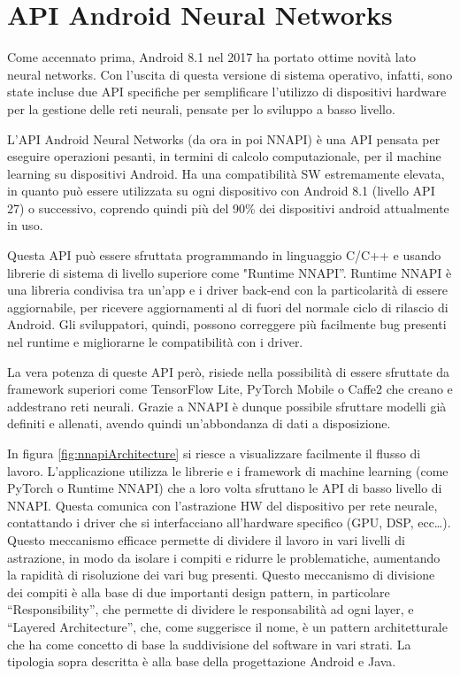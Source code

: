 
\section{API Android Neural Networks}
Come accennato prima, Android 8.1 nel 2017 ha portato ottime novità lato neural networks. Con l’uscita di questa versione di sistema operativo, infatti,
sono state incluse due API specifiche per semplificare l’utilizzo di dispositivi hardware per la gestione delle reti neurali, pensate per lo sviluppo a
basso livello.

L’API Android Neural Networks (da ora in poi NNAPI) è una API pensata per eseguire operazioni pesanti, in termini di calcolo computazionale, per il machine learning su
dispositivi Android. Ha una compatibilità SW estremamente elevata, in quanto può essere utilizzata su ogni dispositivo con Android 8.1 (livello API 27) o successivo,
coprendo quindi più del 90\% dei dispositivi android attualmente in uso.

Questa API può essere sfruttata programmando in linguaggio C/C++ e usando librerie di sistema di livello superiore come "Runtime NNAPI”.
Runtime NNAPI è una libreria condivisa tra un’app e i driver back-end con la particolarità di essere aggiornabile, per ricevere aggiornamenti
al di fuori del normale ciclo di rilascio di Android. Gli sviluppatori, quindi, possono correggere più facilmente bug presenti nel runtime e migliorarne
le compatibilità con i driver.

La vera potenza di queste API però, risiede nella possibilità di essere sfruttate da framework superiori come TensorFlow Lite, PyTorch Mobile o Caffe2 che
creano e addestrano reti neurali. Grazie a NNAPI è dunque possibile sfruttare modelli già definiti e allenati, avendo quindi un’abbondanza di dati a
disposizione.

In figura \ref{fig:nnapiArchitecture} si riesce a visualizzare facilmente il flusso di lavoro. L’applicazione utilizza le librerie e i framework di machine
learning (come PyTorch o Runtime NNAPI) che a loro volta sfruttano le API di basso livello di NNAPI.
Questa comunica con l’astrazione HW del dispositivo per rete neurale, contattando i driver che si interfacciano all’hardware specifico (GPU, DSP, ecc\dots).
Questo meccanismo efficace permette di dividere il lavoro in vari livelli di astrazione, in modo da isolare i compiti e ridurre le problematiche, aumentando
la rapidità di risoluzione dei vari bug presenti. Questo meccanismo di divisione dei compiti è alla base di due importanti design pattern, in particolare
“Responsibility”, che permette di dividere le responsabilità ad ogni layer, e “Layered Architecture”, che, come suggerisce il nome, è un pattern architetturale
che ha come concetto di base la suddivisione del software in vari strati. La tipologia sopra descritta è alla base della progettazione Android e Java.

